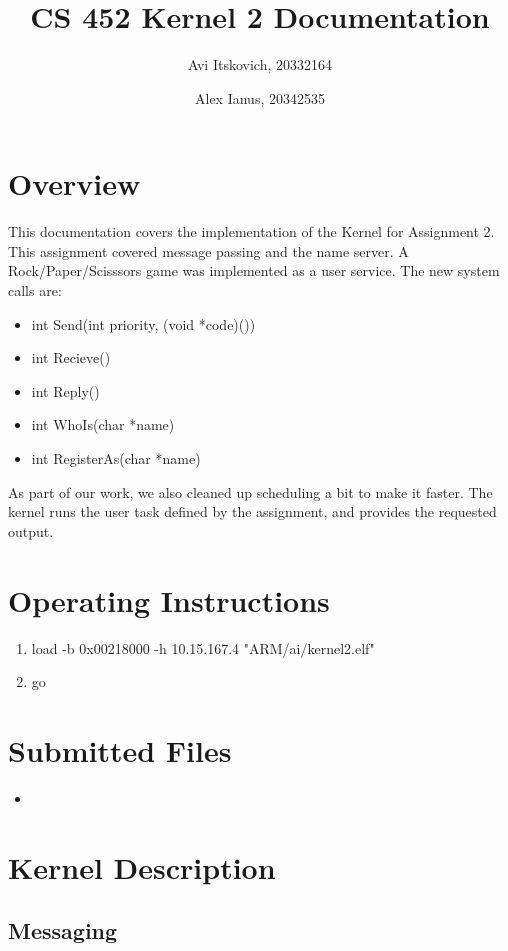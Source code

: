 \documentclass{article}
\title{CS 452 Kernel 2 Documentation}
\author{
  Avi Itskovich, 20332164
  \and
  Alex Ianus, 20342535
}
\begin{document}
\maketitle

\section{Overview}

This documentation covers the implementation of the Kernel for Assignment 2. This assignment covered message passing and the name server. A Rock/Paper/Scisssors game was implemented as a user service. The new system calls are: 
\begin{itemize}
  \item int Send(int priority, (void *code)())
  \item int Recieve()
  \item int Reply()
  \item int WhoIs(char *name)
  \item int RegisterAs(char *name)
\end{itemize}
As part of our work, we also cleaned up scheduling a bit to make it faster. The kernel runs the user task defined by the assignment, and provides the requested output.

\section{Operating Instructions}
\begin{enumerate}
  \item load -b 0x00218000 -h 10.15.167.4 "ARM/ai/kernel2.elf"
  \item go
\end{enumerate}

\section{Submitted Files}
\begin{itemize}
    \item
\end{itemize}

\section{Kernel Description}

\subsection{Messaging}
\end{document}
